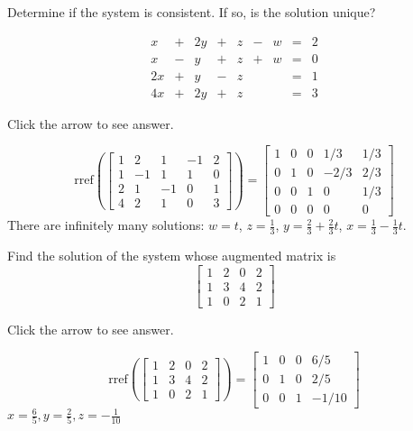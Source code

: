 \documentclass{ximera}
\begin{document}
\begin{problem}\label{prb:2.16}
Determine if the system is consistent. If so, is the solution unique?

$$\begin{array}{ccccccccc}
      x & +&2y&+&z&-&w&= &2 \\
	 x& -&y&+&z&+&w&=&0\\
     2x& +&y&-&z&&&=&1\\
     4x&+&2y&+&z&&&=&3
    \end{array}$$

Click the arrow to see answer. 
\begin{expandable}{}{}
$$\text{rref}\left(\left[
\begin{array}{rrrr|r}
1 & 2 & 1 & -1 & 2 \\
1 & -1 & 1 & 1 & 0 \\
2 & 1 & -1 & 0 & 1 \\
4 & 2 & 1 & 0 & 3
\end{array}
\right]\right)=\left[
\begin{array}{rrrr|r}
1 & 0 & 0 & 1/3 & 1/3 \\
0 & 1 & 0 & -2/3 & 2/3 \\
0 & 0 & 1 & 0 & 1/3 \\
0 & 0 & 0 & 0 & 0
\end{array}
\right] $$
There are infinitely many solutions: $w=t$, $z=\frac{1}{3}$, $y=\frac{2}{3}+\frac{2}{3}t$, $x=\frac{1}{3}-\frac{1}{3}t$.
\end{expandable}
\end{problem}

\begin{problem}\label{prb:2.25} Find the solution of the system whose augmented matrix is
\begin{equation*}
\left[
\begin{array}{rrr|r}
1 & 2 & 0 & 2 \\
1 & 3 & 4 & 2 \\
1 & 0 & 2 & 1
\end{array}
\right]
\end{equation*}

Click the arrow to see answer. 
\begin{expandable}{}{}

$$\text{rref}\left(\left[
\begin{array}{rrr|r}
1 & 2 & 0 & 2 \\
1 & 3 & 4 & 2 \\
1 & 0 & 2 & 1
\end{array}
\right]\right)=\left[
\begin{array}{rrr|r}
1 & 0 & 0 & 6/5 \\
0 & 1 & 0 & 2/5 \\
0 & 0 & 1 & -1/10
\end{array}
\right]$$
$x=\frac{6}{5}, y=\frac{2}{5}, z=-\frac{1}{10}$
\end{expandable}
\end{problem}
\end{document}
